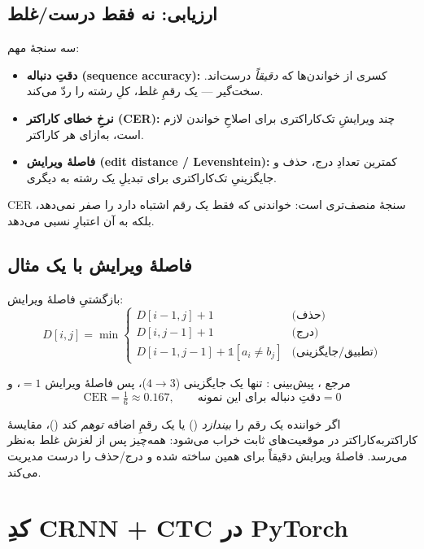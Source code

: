 \documentclass[12pt,a4paper]{article}
\begin{document}
\subsection{ارزیابی: نه فقط درست/غلط}

سه سنجهٔ مهم:

\begin{itemize}
  \item \textbf{دقتِ دنباله (sequence accuracy):} کسری از خواندن‌ها که \emph{دقیقاً} درست‌اند. سخت‌گیر — یک رقمِ غلط، کلِ رشته را ردّ می‌کند.
  \item \textbf{نرخِ خطای کاراکتر (CER):} چند ویرایشِ تک‌کاراکتری برای اصلاحِ خواندن لازم است، به‌ازای هر کاراکتر.
  \item \textbf{فاصلهٔ ویرایش (edit distance / Levenshtein):} کمترین تعدادِ درج، حذف و جایگزینیِ تک‌کاراکتری برای تبدیلِ یک رشته به دیگری.
\end{itemize}

CER سنجهٔ منصف‌تری است: خواندنی که فقط یک رقم اشتباه دارد را صفر نمی‌دهد، بلکه به آن اعتبارِ نسبی می‌دهد.

\subsection{فاصلهٔ ویرایش با یک مثال}

\begin{riyazi}
بازگشتیِ فاصلهٔ ویرایش:
\[
D[i,j]=\min\begin{cases}
D[i{-}1,j]+1 & \text{(حذف)}\\
D[i,j{-}1]+1 & \text{(درج)}\\
D[i{-}1,j{-}1]+\mathbb{1}[a_i\neq b_j] & \text{(تطبیق/جایگزینی)}
\end{cases}
\]
\end{riyazi}

مرجع ، پیش‌بینی : تنها یک جایگزینی ($4\to3$)، پس فاصلهٔ ویرایش $=1$، و
\[
\text{CER} = \tfrac{1}{6} \approx 0.167, \qquad \text{دقتِ دنباله برای این نمونه} = 0
\]

\begin{hoshdar}
اگر خواننده یک رقم را \emph{بیندازد} () یا یک رقمِ اضافه \emph{توهم} کند ()، مقایسهٔ کاراکتر‌به‌کاراکتر در موقعیت‌های ثابت خراب می‌شود: همه‌چیز پس از لغزش غلط به‌نظر می‌رسد. فاصلهٔ ویرایش دقیقاً برای همین ساخته شده و درج/حذف را درست مدیریت می‌کند.
\end{hoshdar}

\section{کدِ CRNN + CTC در PyTorch}
\end{document}
